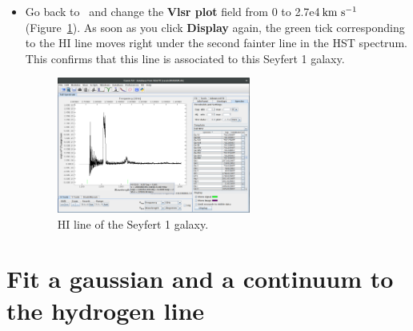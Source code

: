 \documentclass [a4paper, 12pt]{article}
\begin{document}
\begin{itemize}
\item Go back to \cassis\ and change the \textbf{Vlsr plot} field from 0 to
2.7e4\,$\rm km\ s^{-1}$ (Figure~\ref{fig:spectrum3}). As soon as you click
\textbf{Display} again, the green tick
corresponding to the HI line moves right under the second fainter line in the
HST spectrum. This confirms that this line is associated to this Seyfert 1
galaxy.
\begin{figure}[H]
\center
\includegraphics[width=0.6\textwidth]{../images/cassis_redshifted_line.png}
\caption{HI line of the Seyfert 1 galaxy.}
\label{fig:spectrum3}
\end{figure}
\end{itemize}

\section{Fit a gaussian and a continuum to the hydrogen line}
\end{document}
